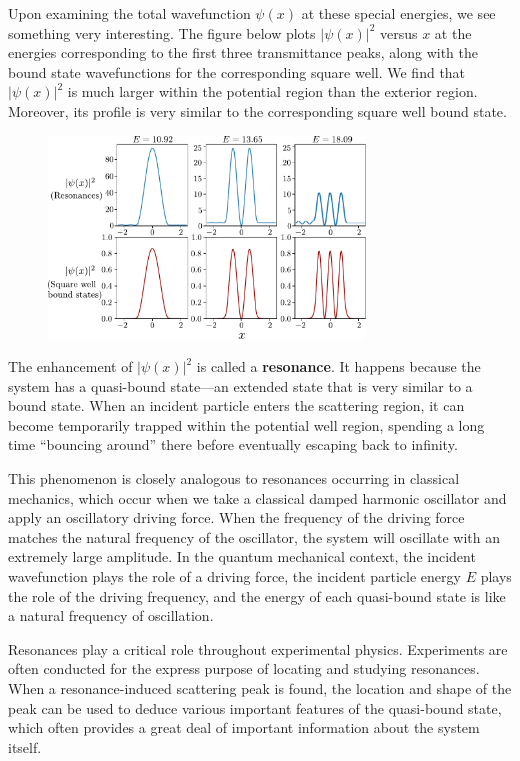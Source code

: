 \documentclass[pra,12pt]{revtex4}
\begin{document}
Upon examining the total wavefunction $\psi(x)$ at these special
energies, we see something very interesting.  The figure below plots
$|\psi(x)|^2$ versus $x$ at the energies corresponding to the first
three transmittance peaks, along with the bound state wavefunctions
for the corresponding square well.  We find that $|\psi(x)|^2$ is much
larger within the potential region than the exterior region.
Moreover, its profile is very similar to the corresponding square well
bound state.

\begin{figure}[h]
  \centering\includegraphics[width=0.75\textwidth]{resonancewavefunctions}
\end{figure}

The enhancement of $|\psi(x)|^2$ is called a \textbf{resonance}.  It
happens because the system has a quasi-bound state---an extended state
that is very similar to a bound state.  When an incident particle
enters the scattering region, it can become temporarily trapped within
the potential well region, spending a long time ``bouncing around''
there before eventually escaping back to infinity.

This phenomenon is closely analogous to resonances occurring in
classical mechanics, which occur when we take a classical damped
harmonic oscillator and apply an oscillatory driving force.  When the
frequency of the driving force matches the natural frequency of the
oscillator, the system will oscillate with an extremely large
amplitude.  In the quantum mechanical context, the incident
wavefunction plays the role of a driving force, the incident particle
energy $E$ plays the role of the driving frequency, and the energy of
each quasi-bound state is like a natural frequency of oscillation.

Resonances play a critical role throughout experimental physics.
Experiments are often conducted for the express purpose of locating
and studying resonances.  When a resonance-induced scattering peak is
found, the location and shape of the peak can be used to deduce
various important features of the quasi-bound state, which often
provides a great deal of important information about the system
itself.
\end{document}
